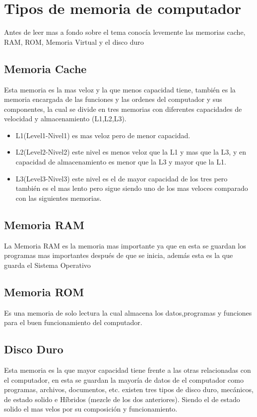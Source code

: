 \documentclass{article}
\begin{document}
	\section{Tipos de memoria de computador} \label{contenido}
	Antes de leer mas a fondo sobre el tema conocía levemente las memorias cache, RAM, ROM, Memoria Virtual y el disco duro
	\subsection{Memoria Cache}
	Esta memoria es la mas veloz y la que menos capacidad tiene, también es la memoria encargada de las funciones y las ordenes del computador y sus componentes, la cual se divide en tres memorias con diferentes capacidades de velocidad y almacenamiento  (L1,L2,L3).
	\begin{itemize}
		\item{L1(Level1-Nivel1) es mas veloz pero de menor capacidad.}
		\item{L2(Level2-Nivel2) este nivel es menos veloz que la L1 y mas que la L3, y en capacidad de almacenamiento es menor que la L3 y mayor que la L1.}
		\item {L3(Level3-Nivel3) este nivel es el de mayor capacidad de los tres pero también es el mas lento pero sigue siendo uno de los mas veloces comparado con las siguientes memorias.}
	\end{itemize}
	
	\subsection{Memoria RAM}
	La Memoria RAM es la memoria mas importante ya que en esta se guardan los programas mas importantes después de que se inicia, además esta es la que guarda el Sistema Operativo
	
	\subsection{Memoria ROM}
	Es una memoria de solo lectura la cual almacena los datos,programas y funciones para el buen funcionamiento del computador. \cite{rom}
	
	\subsection{Disco Duro}
	Esta memoria es la que mayor capacidad tiene frente a las otras relacionadas con el computador, en esta se guardan la mayoría de datos de el computador como programas, archivos, documentos, etc. existen tres tipos de disco duro, mecánicos, de estado solido e Híbridos (mezcle de los dos anteriores). Siendo el de estado solido el mas velos por su composición y funcionamiento.
	
\end{document}
